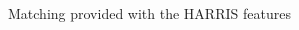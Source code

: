 \documentclass[twoside]{article}
\begin{document}
\begin{multicols}{2}
\begin{figure}[H]
\centering
{}
\quad
{}
\caption{Matching provided with the HARRIS features}
\label{fig:fig_sift}
\end{figure}


\end{multicols}
\end{document}
